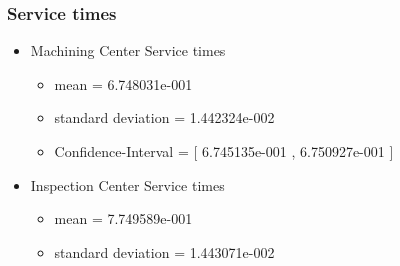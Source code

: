 \documentclass[aps,letterpaper,10pt]{revtex4}
\begin{document}
        \subsubsection{Service times}
            \begin{itemize}
                \item Machining Center Service times
                    \begin{itemize}
                        \item mean = 6.748031e-001
                        \item standard deviation = 1.442324e-002
                        \item Confidence-Interval = [ 6.745135e-001 , 6.750927e-001 ]
                    \end{itemize}
                    \begin{figure}[htp]
                        \begin{center}
                        \end{center}
                    \end{figure}
                \item Inspection Center Service times
                    \begin{itemize}
                        \item mean = 7.749589e-001
                        \item standard deviation = 1.443071e-002

\end{itemize}
\end{itemize}
\end{document}
